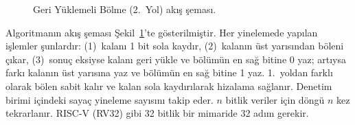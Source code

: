 \begin{figure}[htbp]
\caption[Geri Y{\"u}klemeli B{\"o}lme (2.\ Yol) ak{\i}{\c{s}} {\c{s}}emas{\i}]{Geri Y{\"u}klemeli B{\"o}lme (2.\ Yol) ak{\i}{\c{s}} {\c{s}}emas{\i}.}
\label{fig:bolme-2yol-algo}
\end{figure}

Algoritmanın akış şeması Şekil~\ref{fig:bolme-2yol-algo}'te gösterilmiştir. Her yinelemede yapılan işlemler şunlardır: (1)~kalanı 1 bit sola kaydır, (2)~kalanın üst yarısından böleni çıkar, (3)~sonuç eksiyse kalanı geri yükle ve bölümün en sağ bitine 0 yaz; artıysa farkı kalanın üst yarısına yaz ve bölümün en sağ bitine 1 yaz. 1.\ yoldan farklı olarak bölen sabit kalır ve kalan sola kaydırılarak hizalama sağlanır. Denetim birimi içindeki sayaç yineleme sayısını takip eder. $n$ bitlik veriler için döngü $n$ kez tekrarlanır. RISC-V (RV32) gibi 32 bitlik bir mimaride 32 adım gerekir.

